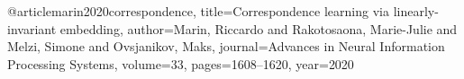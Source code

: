 @article{marin2020correspondence,
  title={Correspondence learning via linearly-invariant embedding},
  author={Marin, Riccardo and Rakotosaona, Marie-Julie and Melzi, Simone and Ovsjanikov, Maks},
  journal={Advances in Neural Information Processing Systems},
  volume={33},
  pages={1608--1620},
  year={2020}
}